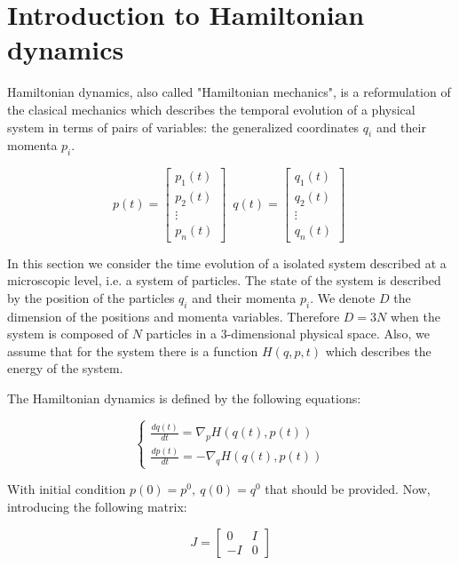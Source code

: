 \documentclass{report}
\begin{document}
\section{Introduction to Hamiltonian dynamics}
\label{sec:introduction_hamiltonian_dynamics}

Hamiltonian dynamics, also called "Hamiltonian mechanics", is a reformulation of the clasical mechanics which describes the temporal evolution of a physical system in terms of pairs of variables: the generalized coordinates \(q_i\) and their momenta \(p_i\).

\begin{equation*}
	p(t) = \begin{bmatrix} p_1(t) \\ p_2(t) \\ \vdots \\ p_n(t) \end{bmatrix} \; \ 
	q(t) = \begin{bmatrix} q_1(t) \\ q_2(t) \\ \vdots \\ q_n(t) \end{bmatrix} \;
\end{equation*}

In this section we consider the time evolution of a isolated system described at a microscopic level, i.e. a system of particles. The state of the system is described by the position of the particles \(q_i\) and their momenta \(p_i\). We denote \(D\) the dimension of the positions and momenta variables. Therefore \(D = 3N\) when the system is composed of \(N\) particles in a 3-dimensional physical space. Also, we assume that for the system there is a function \(H(q,p,t)\) which describes the energy of the system.

The Hamiltonian dynamics is defined by the following equations:

\begin{equation} 
	\label{eq:hamiltoniandynamics1} 
	\begin{cases}
		\frac{dq(t)}{dt} = \nabla_p H(q(t), p(t)) \\
		\frac{dp(t)}{dt} = -\nabla_q H(q(t), p(t))
	\end{cases}
\end{equation}

With initial condition \(p(0)=p^0, \ q(0)=q^0\) that should be provided. Now, introducing the following matrix:

\begin{equation*}
	J = \begin{bmatrix} 0 & I \\ -I & 0 \end{bmatrix}
\end{equation*}
\end{document}
